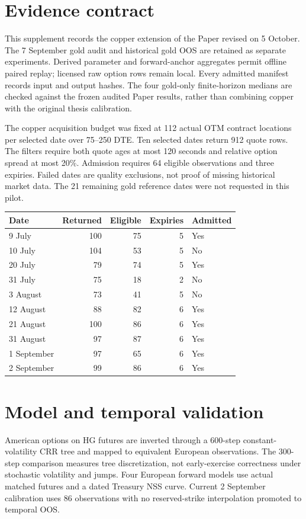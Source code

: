 \documentclass[10pt,a4paper]{article}
\begin{document}
\maketitle
\section{Evidence contract}
This supplement records the copper extension of the Paper revised on 5 October. The 7 September gold audit and historical gold OOS are retained as separate experiments. Derived parameter and forward-anchor aggregates permit offline paired replay; licensed raw option rows remain local. Every admitted manifest records input and output hashes. The four gold-only finite-horizon medians are checked against the frozen audited Paper results, rather than combining copper with the original thesis calibration.

The copper acquisition budget was fixed at 112 actual OTM contract locations per selected date over 75--250 DTE. Ten selected dates return 912 quote rows. The filters require both quote ages at most 120 seconds and relative option spread at most 20\%. Admission requires 64 eligible observations and three expiries. Failed dates are quality exclusions, not proof of missing historical market data. The 21 remaining gold reference dates were not requested in this pilot.

\begin{center}\begin{tabular}{lrrrl}\toprule
Date & Returned & Eligible & Expiries & Admitted \\\midrule
9 July & 100 & 75 & 5 & Yes \\
10 July & 104 & 53 & 5 & No \\
20 July & 79 & 74 & 5 & Yes \\
31 July & 75 & 18 & 2 & No \\
3 August & 73 & 41 & 5 & No \\
12 August & 88 & 82 & 6 & Yes \\
21 August & 100 & 86 & 6 & Yes \\
31 August & 97 & 87 & 6 & Yes \\
1 September & 97 & 65 & 6 & Yes \\
2 September & 99 & 86 & 6 & Yes \\
\bottomrule\end{tabular}\end{center}

\section{Model and temporal validation}
American options on HG futures are inverted through a 600-step constant-volatility CRR tree and mapped to equivalent European observations. The 300-step comparison measures tree discretization, not early-exercise correctness under stochastic volatility and jumps. Four European forward models use actual matched futures and a dated Treasury NSS curve. Current 2 September calibration uses 86 observations with no reserved-strike interpolation promoted to temporal OOS.
\end{document}
